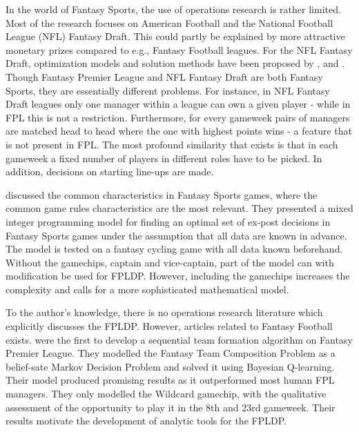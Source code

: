 \newpar

In the world of Fantasy Sports, the use of operations research is rather limited. Most of the research focuses on American Football and the National Football League (NFL) Fantasy Draft. This could partly be explained by more attractive monetary prizes compared to e.g., Fantasy Football leagues. For the NFL Fantasy Draft, optimization models and solution methods have been proposed by \cite{Fry}, \cite{Gibson} and \cite{Becker}. Though Fantasy Premier League and NFL Fantasy Draft are both Fantasy Sports, they are essentially different problems. For instance, in NFL Fantasy Draft leagues only one manager within a league can own a given player - while in FPL this is not a restriction. Furthermore, for every gameweek pairs of managers are matched head to head where the one with highest points wins - a feature that is not present in FPL. The most profound similarity that exists is that in each gameweek a fixed number of players in different roles have to be picked. In addition, decisions on starting line-ups are made. 



\newpar

\cite{Mathsports} discussed the common characteristics in Fantasy Sports games, where the common game rules characteristics are the most relevant. They presented a mixed integer programming model for finding an optimal set of ex-post decisions in Fantasy Sports games under the assumption that all data are known in advance. The model is tested on a fantasy cycling game with all data known beforehand. Without the gamechips, captain and vice-captain, part of the model can with modification be used for FPLDP. However, including the gamechips increases the complexity and calls for a more sophisticated mathematical model. 

\newpar

To the author's knowledge, there is no operations research literature which explicitly discusses the FPLDP. However, articles related to Fantasy Football exists. \cite{Matthews} were the first to develop a sequential team formation algorithm on Fantasy Premier League. They modelled the Fantasy Team Composition Problem as a belief-sate Markov Decision Problem and solved it using Bayesian Q-learning. Their model produced promising results as it outperformed most human FPL managers. They only modelled the Wildcard gamechip, with the qualitative assessment of the opportunity to play it in the 8th and 23rd gameweek. Their results motivate the development of analytic tools for the FPLDP. 

